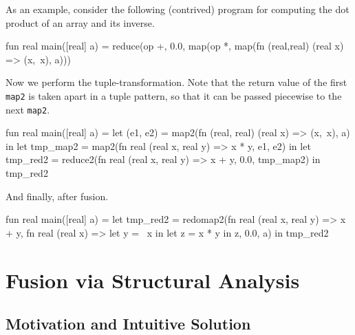 \documentclass{sigplanconf}  %
\begin{document}
As an example, consider the following (contrived) program for
computing the dot product of an array and its inverse.

\begin{colorcode}
fun real main([real] a) =
  reduce(op +, 0.0,
         map(op *,
             map(fn (real,real) (real x) => (x,~x),
                 a)))
\end{colorcode}
Now we perform the tuple-transformation.  Note that the return value
of the first {\tt map2} is taken apart in a tuple pattern, so that it
can be passed piecewise to the next {\tt map2}.
\begin{colorcode}
fun real main([real] a) =
  let (e1, e2) =
    map2(fn (real, real) (real x) =>
         (x,~x), a) in
  let tmp_map2 =
    map2(fn real (real x, real y) => x * y,
         e1, e2) in
  let tmp_red2 =
    reduce2(fn real (real x, real y) =>
            x + y, 0.0, tmp_map2) in
  tmp_red2
\end{colorcode}
And finally, after fusion.
\begin{colorcode}
fun real main([real] a) =
  let tmp_red2 =
    redomap2(fn real (real x, real y) => x + y,
             fn real (real x) =>
               let y = ~x in
               let z = x * y in z,
             0.0, a) in
  tmp_red2
\end{colorcode}

\section{Fusion via Structural Analysis}


\subsection{Motivation and Intuitive Solution}
\label{sec:Intuition}
\end{document}
